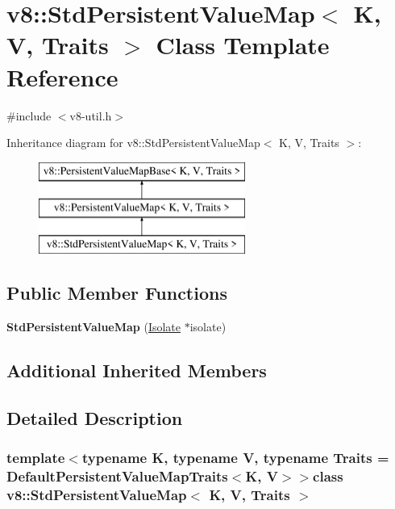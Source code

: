 \hypertarget{classv8_1_1_std_persistent_value_map}{}\section{v8\+:\+:Std\+Persistent\+Value\+Map$<$ K, V, Traits $>$ Class Template Reference}
\label{classv8_1_1_std_persistent_value_map}


{\ttfamily \#include $<$v8-\/util.\+h$>$}

Inheritance diagram for v8\+:\+:Std\+Persistent\+Value\+Map$<$ K, V, Traits $>$\+:\begin{figure}[H]
\begin{center}
\leavevmode
\includegraphics[height=3.000000cm]{classv8_1_1_std_persistent_value_map}
\end{center}
\end{figure}
\subsection*{Public Member Functions}
\begin{DoxyCompactItemize}
\item 
\hypertarget{classv8_1_1_std_persistent_value_map_a44d7222a863267780db07c882056f73b}{}{\bfseries Std\+Persistent\+Value\+Map} (\hyperlink{classv8_1_1_isolate}{Isolate} $\ast$isolate)\label{classv8_1_1_std_persistent_value_map_a44d7222a863267780db07c882056f73b}

\end{DoxyCompactItemize}
\subsection*{Additional Inherited Members}


\subsection{Detailed Description}
\subsubsection*{template$<$typename K, typename V, typename Traits = Default\+Persistent\+Value\+Map\+Traits$<$\+K, V$>$$>$class v8\+::\+Std\+Persistent\+Value\+Map$<$ K, V, Traits $>$}

